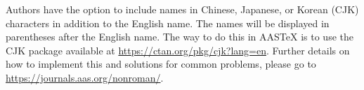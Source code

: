 \documentclass[linenumbers,trackchanges]{aastex701}
\begin{document}
Authors have the option to include names in Chinese, Japanese, or Korean (CJK)
characters in addition to the English name. The names will be displayed
in parentheses after the English name. The way to do this in AASTeX is to
use the CJK package available at \url{https://ctan.org/pkg/cjk?lang=en}.
Further details on how to implement this and solutions for common problems,
please go to \url{https://journals.aas.org/nonroman/}.


{}



\end{document}
